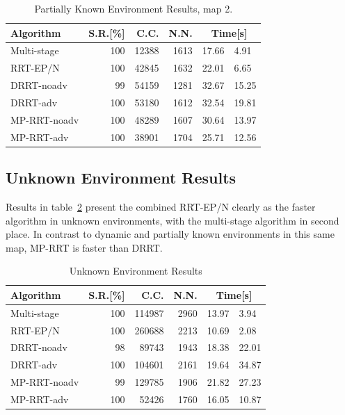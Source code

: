 \begin{table}[h!]
\caption{Partially Known Environment Results, map 2.}
\label{table:partial2}
\centering
\begin{tabular}{|l||r|r|r|r@{$\ \pm\ $}l|}
\hline
\textbf{Algorithm} & \textbf{S.R.[\%]} & \textbf{C.C.} & \textbf{N.N.} &
\multicolumn{2}{c|}{\textbf{Time[s]}}\\
\hline
Multi-stage & 100 & 12388 & 1613 & 17.66 & 4.91\\
\hline
RRT-EP/N & 100 & 42845 & 1632 & 22.01 & 6.65 \\
\hline
DRRT-noadv & 99 & 54159 & 1281 & 32.67 & 15.25\\
\hline
DRRT-adv & 100 & 53180 & 1612 & 32.54 & 19.81\\
\hline
MP-RRT-noadv & 100 & 48289 & 1607 & 30.64 & 13.97\\
\hline
MP-RRT-adv & 100 & 38901 & 1704 & 25.71 & 12.56\\
\hline
\end{tabular}
\end{table}

\subsection{Unknown Environment Results}

Results in table~\ref{table:unknown} present the combined RRT-EP/N clearly as
the faster algorithm in unknown environments, with the multi-stage algorithm in
second place. In contrast to dynamic and partially known environments in this
same map, MP-RRT is faster than DRRT.

\begin{table}[h!]
\caption{Unknown Environment Results}
\label{table:unknown}
\centering
\begin{tabular}{|l||r|r|r|r@{$\ \pm\ $}l|}
\hline
\textbf{Algorithm} & \textbf{S.R.[\%]} & \textbf{C.C.} & \textbf{N.N.} &
\multicolumn{2}{c|}{\textbf{Time[s]}}\\
\hline
Multi-stage & 100 & 114987 & 2960 & 13.97 & 3.94\\
\hline
RRT-EP/N & 100 & 260688 & 2213 & 10.69 & 2.08 \\
\hline
DRRT-noadv & 98 & 89743 & 1943 & 18.38 & 22.01\\
\hline
DRRT-adv & 100 & 104601 & 2161 & 19.64 & 34.87\\
\hline
MP-RRT-noadv & 99 & 129785 & 1906 & 21.82 & 27.23\\
\hline
MP-RRT-adv & 100 & 52426 & 1760 & 16.05 & 10.87\\
\hline
\end{tabular}
\end{table}
